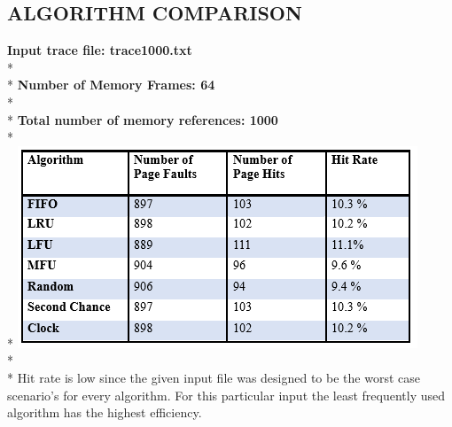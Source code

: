 \documentclass[12pt, oneside, a4paper]{report}
\begin{document}
\subsection*{ALGORITHM COMPARISON}
\textbf{Input trace file: trace1000.txt}
\\*
\\*
\textbf{Number of Memory Frames: 64}
\\*
\\*
\textbf{Total number of memory references: 1000}
\\*
\\*
\includegraphics[scale=1.2]{compare}
\\*
\\*
Hit rate is low since the given input file was designed to be the worst case scenario's for every algorithm. For this particular input the least frequently used algorithm has the highest efficiency.
\end{document}
